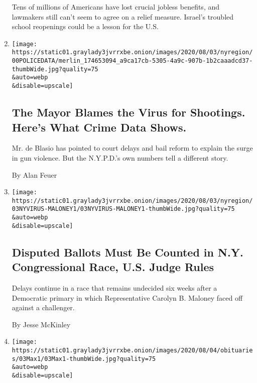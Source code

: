 \begin{enumerate}
  Tens of millions of Americans have lost crucial jobless benefits, and
  lawmakers still can't seem to agree on a relief measure. Israel's
  troubled school reopenings could be a lesson for the U.S.
\item
  \href{/2020/08/04/nyregion/nyc-shootings-coronavirus.html}{}

  \texttt{[image: https://static01.graylady3jvrrxbe.onion/images/2020/08/03/nyregion/00POLICEDATA/merlin\_174653094\_a9ca17cb-5305-4a9c-907b-1b2caaadcd37-thumbWide.jpg?quality=75\\\&auto=webp\\\&disable=upscale]}

  \hypertarget{the-mayor-blames-the-virus-for-shootings-heres-what-crime-data-shows}{%
  \subsection{The Mayor Blames the Virus for Shootings. Here's What
  Crime Data
  Shows.}\label{the-mayor-blames-the-virus-for-shootings-heres-what-crime-data-shows}}

  Mr. de Blasio has pointed to court delays and bail reform to explain
  the surge in gun violence. But the N.Y.P.D.'s own numbers tell a
  different story.

  By Alan Feuer
\item
  \href{/2020/08/03/nyregion/nyc-congress-carolyn-mahoney-ballots.html}{}

  \texttt{[image: https://static01.graylady3jvrrxbe.onion/images/2020/08/03/nyregion/03NYVIRUS-MALONEY1/03NYVIRUS-MALONEY1-thumbWide.jpg?quality=75\\\&auto=webp\\\&disable=upscale]}

  \hypertarget{disputed-ballots-must-be-counted-in-ny-congressional-race-us-judge-rules}{%
  \subsection{Disputed Ballots Must Be Counted in N.Y. Congressional
  Race, U.S. Judge
  Rules}\label{disputed-ballots-must-be-counted-in-ny-congressional-race-us-judge-rules}}

  Delays continue in a race that remains undecided six weeks after a
  Democratic primary in which Representative Carolyn B. Maloney faced
  off against a challenger.

  By Jesse McKinley
\item
  \href{/2020/08/03/arts/adam-max-patron-of-brooklyn-cultural-institutions-dies-at-62.html}{}

  \texttt{[image: https://static01.graylady3jvrrxbe.onion/images/2020/08/04/obituaries/03Max1/03Max1-thumbWide.jpg?quality=75\\\&auto=webp\\\&disable=upscale]}


\end{enumerate}
